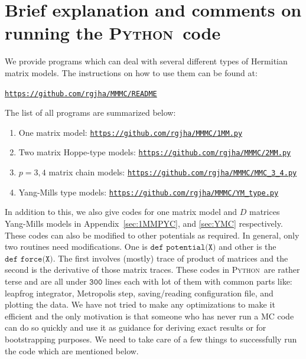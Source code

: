 \documentclass[letter,11pt]{article}
\newcommand{\PY}{\textsc{Python}}
\begin{document}
\section{\label{sec:BEOC}Brief explanation and comments on 
running the \PY~code}
We provide programs which can deal with several different types of Hermitian matrix models. The instructions on how to use them can be found at:  
\begin{center} \texttt{\href{https://github.com/rgjha/MMMC\#readme}{https://github.com/rgjha/MMMC/README}} \end{center}
 The list of all programs are summarized below:
\begin{enumerate}
	\item One matrix model: \texttt{\href{https://github.com/rgjha/MMMC/1MM.py}{https://github.com/rgjha/MMMC/1MM.py}}
	\item Two matrix Hoppe-type models: \texttt{\href{https://github.com/rgjha/MMMC/2MM.py}{https://github.com/rgjha/MMMC/2MM.py}}  
	\item $p=3,4$ matrix chain models: \texttt{\href{https://github.com/rgjha/MMMC/MMC_3_4.py}{https://github.com/rgjha/MMMC/MMC\_3\_4.py}}
	\item Yang-Mills type models: \texttt{\href{https://github.com/rgjha/MMMC/YM_type.py}{https://github.com/rgjha/MMMC/YM\_type.py}}
\end{enumerate}
In addition to this, we also give codes for one matrix model and $D$ matrices Yang-Mills models in Appendix~\ref{sec:1MMPYC}, and \ref{sec:YMC} respectively.
These codes can also be modified to other potentials as required. In general, only two routines need modifications. 
One is $\texttt{def potential(X)}$ and other is the $\texttt{def force(X)}$. 
The first involves (mostly) trace of product of matrices and the second is the 
derivative of those matrix traces. 
These codes in \PY~are rather terse
and are all under $\texttt{300}$ lines each
with lot of them with common parts like:
leapfrog integrator, Metropolis step, saving/reading configuration file, 
and plotting the data. We have not tried to make any optimizations to make 
it efficient and the only motivation is that someone who has never run a MC code can do
so quickly and use it as guidance for deriving exact results or for
bootstrapping purposes. We need to take care of a few things to successfully run the code 
which are mentioned below.  
\end{document}
